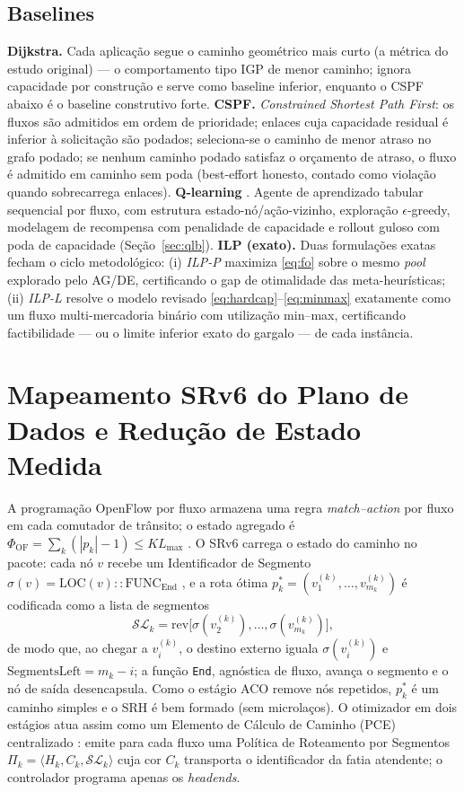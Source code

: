 \documentclass[journal]{IEEEtran}
\begin{document}
\subsection{Baselines}
\textbf{Dijkstra.} Cada aplicação segue o caminho geométrico mais curto (a
métrica do estudo original) --- o comportamento tipo IGP de menor caminho;
ignora capacidade por construção e serve como baseline inferior, enquanto o
CSPF abaixo é o baseline construtivo forte.
\textbf{CSPF.} \emph{Constrained Shortest Path First}: os fluxos são
admitidos em ordem de prioridade; enlaces cuja capacidade residual é
inferior à solicitação são podados; seleciona-se o caminho de menor atraso
no grafo podado; se nenhum caminho podado satisfaz o orçamento de atraso, o
fluxo é admitido em caminho sem poda (best-effort honesto, contado como
violação quando sobrecarrega enlaces).
\textbf{Q-learning} \cite{watkins1992}. Agente de aprendizado tabular sequencial por fluxo,
com estrutura estado-nó/ação-vizinho, exploração $\epsilon$-greedy,
modelagem de recompensa com penalidade de capacidade e rollout guloso com
poda de capacidade (Seção~\ref{sec:qlb}).
\textbf{ILP (exato).} Duas formulações exatas fecham o ciclo metodológico:
(i) \emph{ILP-P} maximiza \eqref{eq:fo} sobre o mesmo \emph{pool} explorado
pelo AG/DE, certificando o gap de otimalidade das meta-heurísticas; (ii)
\emph{ILP-L} resolve o modelo revisado
\eqref{eq:hardcap}--\eqref{eq:minmax} exatamente como um fluxo
multi-mercadoria binário com utilização min--max, certificando
factibilidade --- ou o limite inferior exato do gargalo --- de cada
instância.

\section{Mapeamento SRv6 do Plano de Dados e Redução de Estado Medida}
\label{sec:srv6}
A programação OpenFlow por fluxo armazena uma regra \emph{match--action}
por fluxo em cada comutador de trânsito; o estado agregado é
$\Phi_{\mathrm{OF}}=\sum_{k}(|p_k|-1)\le K L_{\max}$
\cite{mckeown2008}. O SRv6 \cite{rfc8402,rfc8754,rfc8986} carrega o estado
do caminho no pacote: cada nó $v$ recebe um Identificador de Segmento
$\sigma(v)=\mathrm{LOC}(v){:}{:}\mathrm{FUNC}_{\mathrm{End}}$
\cite{rfc8986}, e a rota ótima
$p^{*}_k=(v^{(k)}_1,\ldots,v^{(k)}_{m_k})$ é codificada como a lista de
segmentos
\begin{equation}
\mathcal{SL}_k=\mathrm{rev}\bigl[\sigma(v^{(k)}_2),\ldots,
\sigma(v^{(k)}_{m_k})\bigr],
\label{eq:seglist}
\end{equation}
de modo que, ao chegar a $v^{(k)}_i$, o destino externo iguala
$\sigma(v^{(k)}_i)$ e $\mathrm{SegmentsLeft}=m_k-i$; a função
\texttt{End}, agnóstica de fluxo, avança o segmento e o nó de saída
desencapsula. Como o estágio ACO remove nós repetidos, $p^{*}_k$ é um
caminho simples e o SRH é bem formado (sem microlaços). O otimizador em
dois estágios atua assim como um Elemento de Cálculo de Caminho (PCE)
centralizado \cite{rfc4655}: emite para cada fluxo uma Política de
Roteamento por Segmentos $\Pi_k=\langle H_k, C_k, \mathcal{SL}_k\rangle$
\cite{rfc9256} cuja cor $C_k$ transporta o identificador da fatia
atendente; o controlador programa apenas os \emph{headends}.
\end{document}
